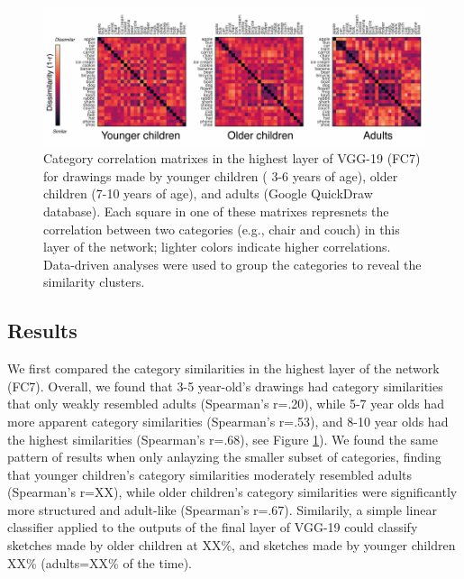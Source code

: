 \documentclass[10pt, letterpaper]{article}
\newenvironment{CodeChunk}{}{}
\begin{document}
\begin{CodeChunk}
\begin{figure}[h]

{\centering \includegraphics{figs/RSAAllCat-1} 

}

\caption[Category correlation matrixes in the highest layer of VGG-19 (FC7) for drawings made by younger children ( 3-6 years of age), older children (7-10 years of age), and adults (Google QuickDraw database)]{Category correlation matrixes in the highest layer of VGG-19 (FC7) for drawings made by younger children ( 3-6 years of age), older children (7-10 years of age), and adults (Google QuickDraw database). Each square in one of these matrixes represnets the correlation between two categories (e.g., chair and couch) in this layer of the network; lighter colors indicate higher correlations. Data-driven analyses were used to group the categories to reveal the similarity clusters. }\label{fig:RSAAllCat}
\end{figure}
\end{CodeChunk}

\subsection{Results}\label{results-1}

We first compared the category similarities in the highest layer of the
network (FC7). Overall, we found that 3-5 year-old's drawings had
category similarities that only weakly resembled adults (Spearman's
r=.20), while 5-7 year olds had more apparent category similarities
(Spearman's r=.53), and 8-10 year olds had the highest similarities
(Spearman's r=.68), see Figure \ref{fig:RSAAllCat}). We found the same
pattern of results when only anlayzing the smaller subset of categories,
finding that younger children's category similarities moderately
resembled adults (Spearman's r=XX), while older children's category
similarities were significantly more structured and adult-like
(Spearman's r=.67). Similarily, a simple linear classifier applied to
the outputs of the final layer of VGG-19 could classify sketches made by
older children at XX\%, and sketches made by younger children XX\%
(adults=XX\% of the time).
\end{document}
